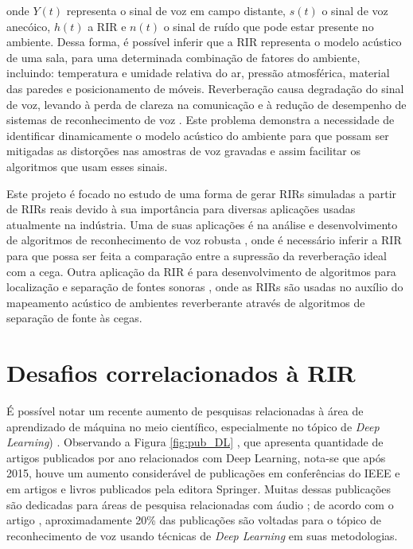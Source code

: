 \noindent
onde $Y(t)$ representa o sinal de voz em campo distante, $s(t)$ o sinal de voz anecóico, $h(t)$ a RIR e $n(t)$ o sinal de ruído que pode
estar presente no ambiente.
Dessa forma, é possível inferir que a RIR representa o modelo acústico de uma sala, para uma determinada combinação de fatores do ambiente, incluindo: 
temperatura e umidade relativa do ar, pressão atmosférica, material das paredes e posicionamento de móveis.
Reverberação causa degradação do sinal de voz, levando à perda de clareza na comunicação \cite{Speech_intellig_hear} e à redução de desempenho
de sistemas de reconhecimento de voz \cite{reverb_sup_speech_reg}. Este problema demonstra a necessidade de identificar dinamicamente o modelo acústico
do ambiente para que possam ser mitigadas as distorções nas amostras de voz gravadas e assim facilitar os algoritmos que usam esses sinais.

Este projeto é focado no estudo de uma forma de gerar RIRs simuladas a partir de RIRs reais devido à sua importância para diversas
aplicações usadas atualmente na indústria. Uma de suas aplicações é na análise e desenvolvimento de algoritmos de 
reconhecimento de voz robusta \cite{reverb_sup_speech_reg}, onde é necessário inferir a RIR para que possa ser feita a comparação entre
a supressão da reverberação ideal com a cega.
Outra aplicação da RIR é para desenvolvimento de algoritmos para localização e separação de fontes sonoras \cite{Source_sep_RIR},
onde as RIRs são usadas no auxílio do mapeamento acústico de ambientes reverberante através de algoritmos de separação de fonte às cegas.

\section{Desafios correlacionados à RIR}

É possível notar um recente aumento de pesquisas relacionadas à área de aprendizado de máquina no meio científico, especialmente no tópico de 
\textit{Deep Learning}) \cite{Study_SR_DL}. Observando a Figura \ref{fig:pub_DL} \cite{Jounal_Awareness_DL}, que apresenta quantidade de artigos
publicados por ano relacionados com Deep Learning, nota-se que após 2015, houve um aumento 
considerável de publicações em conferências do IEEE e em artigos e livros publicados pela editora Springer\textregistered.
Muitas dessas publicações são dedicadas para áreas de pesquisa relacionadas com áudio \cite{Study_SR_DL, Speech_proc_plus_DL, Source_Sep_DL}; de acordo com o artigo \cite{Survey_DL}, aproximadamente 20\% 
das publicações são voltadas para o tópico de reconhecimento de voz usando técnicas de \textit{Deep Learning} em suas metodologias.

